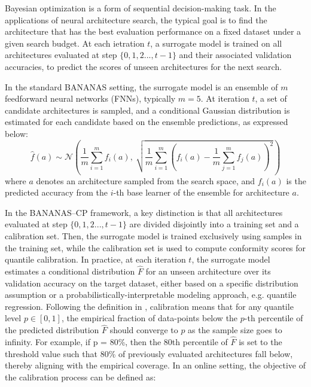 \documentclass[a4paper,oneside,bibliography=totoc]{scrbook}
\begin{document}
{{\begin{algorithm}[htbp]
\begin{algorithmic}[1]
{\begin{enumerate}
{			\item Denote $a_{t}$ as the candidate architecture with maximum $\myfunc{\phi(a)}$; evaluate $\myfunc{f(a_{t})}$.
			\item $\mathcal{A}_{t} \leftarrow{\mathcal{A}_{t-1} \cup \{{a_{t}\}}$
		\end{enumerate}
    \ENDFOR 
    \STATE \textbf{Output:} $a^{*}=\operatorname*{argmin}_{t=1,...,T} f(a_{t})$    
  \end{algorithmic}
  \end{algorithm}

Bayesian optimization is a form of sequential decision-making task. In the applications of neural architecture search, the typical goal is to find the architecture that has the best evaluation performance on a fixed dataset under a given search budget. At each ietration $t$, a surrogate model is trained on all architectures evaluated at step $\{0, 1, 2..., t-1\}$ and their associated validation accuracies, to predict the scores of unseen architectures for the next search.

In the standard BANANAS setting, the surrogate model is an ensemble of $m$ feedforward neural networks (FNNs), typically $m=5$. At iteration $t$, a set of candidate architectures is sampled, and a conditional Gaussian distribution is estimated for each candidate based on the ensemble predictions, as expressed below:
\begin{equation}
\hat{f}(a) \sim \mathcal{N} \left( 
\frac{1}{m} \sum_{i=1}^{m} f_i(a),\ 
\sqrt{\frac{1}{m} \sum_{i=1}^{m} \left(f_i(a) - \frac{1}{m} \sum_{j=1}^{m} f_j(a) \right)^2}
\right)
\label{eq:ensemble_gaussian}
\end{equation}
\noindent
where $a$ denotes an architecture sampled from the search space, and $f_i(a)$ is the predicted accuracy from the $i$-th base learner of the ensemble for architecture $a$.

In the BANANAS--CP framework, a key distinction is that all architectures evaluated at step $\{0, 1, 2..., t-1\}$ are divided disjointly into a training set and a calibration set. Then, the surrogate model is trained exclusively using samples in the training set, while the calibration set is used to compute conformity scores for quantile calibration. In practice, at each iteration $t$, the surrogate model estimates a conditional distribution $\hat{F}$ for an unseen architecture over its validation accuracy on the target dataset, either based on a specific distribution assumption or a probabilistically-interpretable modeling approach, e.g. quantile regression. Following the definition in \cite{deshpande2024online, pmlr-v80-kuleshov18a}, calibration means that for any quantile level $p\in [0, 1]$, the empirical fraction of data-points below the $p$-th percentile of the predicted distribution $\hat{F}$ should converge to $p$ as the sample size goes to infinity. For example, if p = 80\%, then the 80th percentile of $\hat{F}$ is set to the threshold value such that 80\% of previously evaluated architectures fall below, thereby aligning with the empirical coverage. In an online setting, the objective of the calibration process can be defined as:

}}
\end{document}
